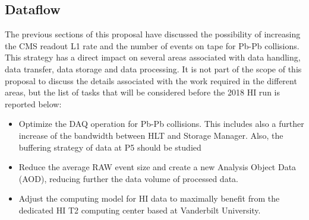 \subsection{Dataflow\label{subsec:dataflow}}
The previous sections of this proposal have discussed the possibility of increasing the CMS readout L1 rate and the number of events on tape for Pb-Pb collisions. This strategy has a direct impact on several areas associated with data handling, data transfer, data storage and data processing. It is not part of the scope of this proposal to discuss the details associated with the work required in the different areas, but the list of tasks that will be considered before the 2018 HI run is reported below:

\begin{itemize}
\item Optimize the DAQ operation for Pb-Pb collisions. This includes also a further increase of the bandwidth between HLT and Storage Manager. Also, the buffering strategy of data at P5 should be studied

\item Reduce the average RAW event size and create a new Analysis Object Data (AOD), reducing further the data volume of processed data.

\item Adjust the computing model for HI data to maximally benefit from the dedicated HI T2 computing center based at Vanderbilt University. 
\end{itemize}

